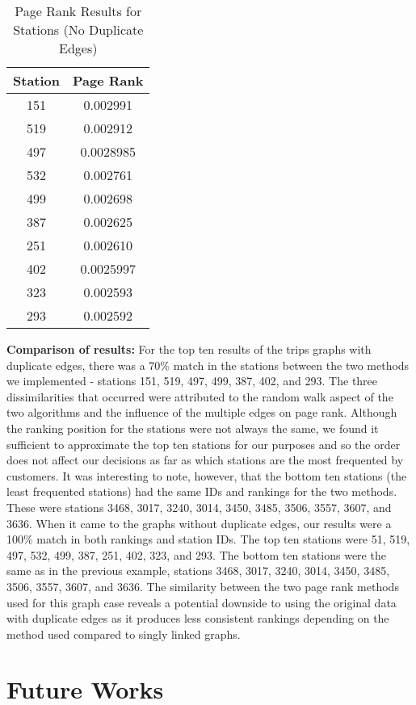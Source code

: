 \documentclass{article}
\begin{document}
 \begin{table}[h!]
\caption{Page Rank Results for Stations (No Duplicate Edges)}
\centering
 \begin{tabular}{||c c||} 
 \hline
 Station & Page Rank \\ [0.5ex] 
 \hline\hline
 151 & 0.002991\\ 
 519 & 0.002912\\
 497 & 0.0028985\\ 
 532 & 0.002761\\
 499 & 0.002698\\
 387 & 0.002625\\
 251 & 0.002610\\
 402 & 0.0025997\\
 323 & 0.002593\\
 293 & 0.002592\\[1ex] 
 \hline
 \end{tabular}
 \end{table}
 \textbf{Comparison of results:}
 \newline
	For the top ten results of the trips graphs with duplicate edges, there was a 70\% match in the stations between the two methods we implemented - stations 151, 519, 497, 499, 387, 402, and 293. The three dissimilarities that occurred were attributed to the random walk aspect of the two algorithms and the influence of the multiple edges on page rank. Although the ranking position for the stations were not always the same, we found it sufficient to approximate the top ten stations for our purposes and so the order does not affect our decisions as far as which stations are the most frequented by customers. It was interesting to note, however, that the bottom ten stations (the least frequented stations) had the same IDs and rankings for the two methods. These were stations  3468, 3017, 3240, 3014, 3450, 3485, 3506, 3557, 3607, and 3636.
 \newline
When it came to the graphs without duplicate edges, our results were a 100\% match in both rankings and station IDs. The top ten stations were 51, 519, 497, 532, 499, 387, 251, 402, 323, and 293. The bottom ten stations were the same as in the previous example, stations 3468, 3017, 3240, 3014, 3450, 3485, 3506, 3557, 3607, and 3636. The similarity between the two page rank methods used for this graph case reveals a potential downside to using the original data with duplicate edges as it produces less consistent rankings depending on the method used compared to singly linked graphs. 
\section{Future Works}
\end{document}

